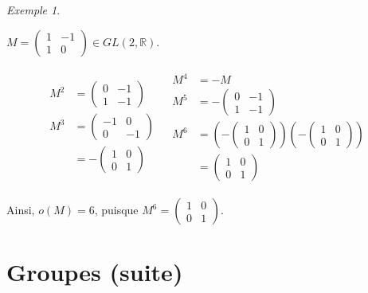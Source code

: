 \documentclass{report}
\newcommand*{\reels}{\mathbb{R}}
\theoremstyle{definition}
\theoremstyle{remark}
\newtheorem*{exem}{Exemple}
\begin{document}
	\begin{exem}
		~

		$M=\begin{pmatrix}
			1&-1\\1&0
		\end{pmatrix} \in GL(2, \reels)$.

		\begin{align*}
			\begin{split}
				M^2&= \begin{pmatrix}
					0&-1\\1&-1
				\end{pmatrix}\\
				M^3&= \begin{pmatrix}
					-1&0\\0&-1
				\end{pmatrix}\\
				&= -\begin{pmatrix}
					1&0\\0&1
				\end{pmatrix}
			\end{split}
			&
			\begin{split}
				M^4&= -M\\
				M^5&= -\begin{pmatrix}
					0&-1\\1&-1
				\end{pmatrix}\\
				M^6&= \left( -\begin{pmatrix}
					1&0\\0&1
				\end{pmatrix} \right) \left( -\begin{pmatrix}
					1&0\\0&1
				\end{pmatrix} \right)\\
				&= \begin{pmatrix}
					1&0\\0&1
				\end{pmatrix}
			\end{split}
		\end{align*}

		Ainsi, $o(M) = 6$, puisque $M^6 = \begin{pmatrix}
			1&0\\0&1
		\end{pmatrix}$.
	\end{exem}

	\setcounter{chapter}{5}
	\chapter{Groupes (suite)}
	\setcounter{section}{12}
\end{document}
